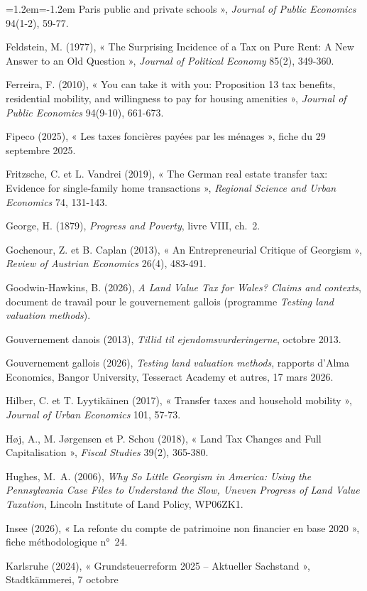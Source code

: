 \documentclass[11pt,a4paper]{article}
\begin{document}
\begin{list}{}{\leftmargin=1.2em\itemindent=-1.2em\itemsep=1pt\parsep=0pt}
Paris public and private schools », \emph{Journal of Public Economics} 94(1-2), 59-77.
\item Feldstein, M. (1977), « The Surprising Incidence of a Tax on Pure Rent: A New Answer to an Old
Question », \emph{Journal of Political Economy} 85(2), 349-360.
\item Ferreira, F. (2010), « You can take it with you: Proposition 13 tax benefits, residential
mobility, and willingness to pay for housing amenities », \emph{Journal of Public Economics} 94(9-10),
661-673.
\item Fipeco (2025), « Les taxes foncières payées par les ménages », fiche du 29 septembre 2025.
\item Fritzsche, C. et L. Vandrei (2019), « The German real estate transfer tax: Evidence for
single-family home transactions », \emph{Regional Science and Urban Economics} 74, 131-143.
\item George, H. (1879), \emph{Progress and Poverty}, livre VIII, ch.~2.
\item Gochenour, Z. et B. Caplan (2013), « An Entrepreneurial Critique of Georgism », \emph{Review of
Austrian Economics} 26(4), 483-491.
\item Goodwin-Hawkins, B. (2026), \emph{A Land Value Tax for Wales? Claims and contexts}, document de
travail pour le gouvernement gallois (programme \emph{Testing land valuation methods}).
\item Gouvernement danois (2013), \emph{Tillid til ejendomsvurderingerne}, octobre 2013.
\item Gouvernement gallois (2026), \emph{Testing land valuation methods}, rapports d'Alma Economics,
Bangor University, Tesseract Academy et autres, 17 mars 2026.
\item Hilber, C. et T. Lyytikäinen (2017), « Transfer taxes and household mobility »,
\emph{Journal of Urban Economics} 101, 57-73.
\item Høj, A., M. Jørgensen et P. Schou (2018), « Land Tax Changes and Full Capitalisation »,
\emph{Fiscal Studies} 39(2), 365-380.
\item Hughes, M.~A. (2006), \emph{Why So Little Georgism in America: Using the Pennsylvania Case
Files to Understand the Slow, Uneven Progress of Land Value Taxation}, Lincoln Institute of Land
Policy, WP06ZK1.
\item Insee (2026), « La refonte du compte de patrimoine non financier en base 2020 », fiche
méthodologique n°~24.
\item Karlsruhe (2024), « Grundsteuerreform 2025 -- Aktueller Sachstand », Stadtkämmerei, 7 octobre

\end{list}
\end{document}
